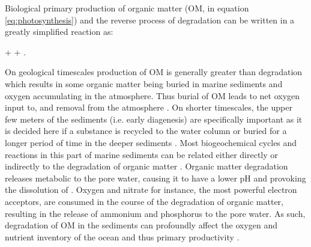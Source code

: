 \documentclass[gmd, manuscript]{copernicus}
\begin{document}
Biological primary production of organic matter (OM,  in equation \ref{eq:photosynthesis}) and the reverse process of degradation can be written in a greatly simplified reaction as:
\begin{reaction}
+ \rightleftharpoons {} + .\label{eq:photosynthesis}
\end{reaction}
On geological timescales production of OM is generally greater than degradation which results in some organic matter being buried in marine sediments and oxygen accumulating in the atmosphere. 
Thus burial of OM leads to net oxygen input to, and  removal from the atmosphere \citep{berner_phanerozoic_2004}. 
On shorter timescales, the upper few meters of the sediments (i.e. early diagenesis) are specifically important as it is decided here if a substance is recycled to the water column or buried for a longer period of time in the 
deeper sediments \citep{hensen_benthic_2006}. 
Most biogeochemical cycles and reactions in this part of marine sediments can be related either directly or indirectly to the degradation of organic matter \citep[e.g][]{boudreau_reactive_1991, arndt_quantifying_2013}. 
Organic matter degradation releases metabolic  to the pore water, causing it to have a lower pH and provoking the dissolution of  \citep{emerson_carbon_1981}.
Oxygen and nitrate for instance, the most powerful electron acceptors, are consumed in the course of the degradation of organic matter, resulting in the release of ammonium and phosphorus to the pore water. 
As such, degradation of OM in the sediments can profoundly affect the oxygen and nutrient inventory of the ocean and thus primary productivity \citep{van_cappellen_benthic_1994, lenton_redfield_2000}. 


\end{document}
